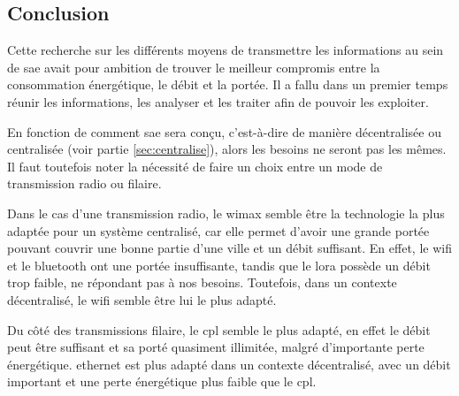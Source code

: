\subsection{Conclusion}
\label{sec:comparaisonProtocoleCommnunicationConclusion}

Cette recherche sur les différents moyens de transmettre les informations au sein de \gls{sae} avait pour ambition de trouver le meilleur compromis entre
la consommation énergétique, le débit et la portée.
Il a fallu dans un premier temps réunir les informations, les analyser et les traiter afin de pouvoir les exploiter.\newline

En fonction de comment \gls{sae} sera conçu, c'est-à-dire de manière décentralisée ou centralisée (voir partie \ref{sec:centralise}), alors les
besoins ne seront pas les mêmes.
Il faut toutefois noter la nécessité de faire un choix entre un mode de transmission radio ou filaire.\newline

Dans le cas d'une transmission radio, le \gls{wimax} semble être la technologie la plus adaptée pour un système centralisé, car elle permet d'avoir
une grande portée pouvant couvrir une bonne partie d'une ville et un débit suffisant.
En effet, le \gls{wifi} et le \gls{bluetooth} ont une portée insuffisante, tandis que le \gls{lora} possède un débit trop faible,
ne répondant pas à nos besoins. Toutefois, dans un contexte décentralisé, le \gls{wifi} semble être lui le plus adapté.\newline

Du côté des transmissions filaire, le \gls{cpl} semble le plus adapté, en effet le débit peut être suffisant et sa porté quasiment illimitée, malgré
d'importante perte énergétique. \Gls{ethernet} est plus adapté dans un contexte décentralisé, avec un débit important et une perte énergétique
plus faible que le \gls{cpl}.
